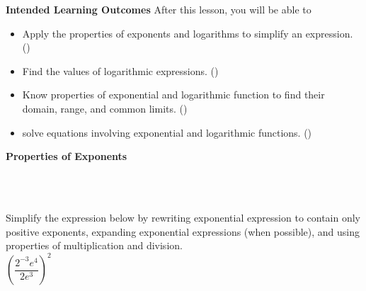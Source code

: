 \documentclass[10pt]{article}
\begin{document}
\pagestyle{otherpages}
\thispagestyle{firstpage}

\textbf{Intended Learning Outcomes}
After this lesson, you will be able to 

\begin{itemize}
    \item Apply the properties of exponents and logarithms to simplify an expression. ()
    \item Find the values of logarithmic expressions. ()
    \item Know properties of exponential and logarithmic function to find their domain, range, and common limits. ()
    \item solve equations involving exponential and logarithmic functions. ()
\end{itemize}

\vspace{-0.5cm}

\hrulefill


{\bf Properties of Exponents}



\,\hfill
{}
\hfill
{}
\hfill
{}
\hfill
{}
\hfill
\,\\

\,\hfill\hfill
{}
\hfill
{}
\hfill
{}
\hfill\hfill\,



 Simplify the expression below by rewriting exponential expression to contain only positive exponents, expanding exponential expressions (when possible), and using properties of multiplication and division.\\

$\left( \dfrac{ 2^{-3}e^4 }{ 2e^3 } \right)^2$

{
\blue{\[\left( \dfrac{ 2^{-3}e^4 }{ 2e^3 } \right)^2 = \left( \dfrac{ e^{4-3} }{ 2\cdot2^{3} } \right)^2 = \left( \dfrac{ e }{ 2^{1+3} } \right)^2 = \left( \dfrac{ e }{ 2^4 } \right)\cdot\left( \dfrac{ e }{ 2^4 } \right) = \dfrac{ e^{1+1} }{ 2^{4+4} } = \fbox{$\dfrac{e^2}{2^8}$}\]
}}
\end{document}
